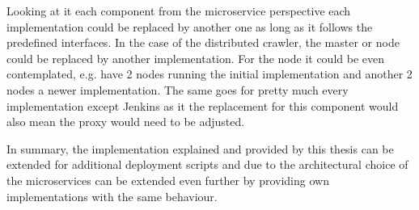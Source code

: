 Looking at it each component from the microservice perspective each implementation could be replaced by another one as long as it follows the predefined interfaces. In the case of the distributed crawler, the master or node could be replaced by another implementation. For the node it could be even contemplated, e.g. have 2 nodes running the initial implementation and another 2 nodes a newer implementation. The same goes for pretty much every implementation except Jenkins as it the replacement for this component would also mean the proxy would need to be adjusted.

In summary, the implementation explained and provided by this thesis can be extended for additional deployment scripts and due to the architectural choice of the microservices can be extended even further by providing own implementations with the same behaviour.




